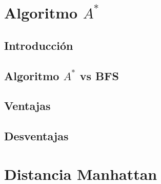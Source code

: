 \section{Algoritmo $A^{*}$}

\subsection*{Introducción}

\subsection*{Algoritmo $A^{*}$ vs BFS}


\subsection{Ventajas}

\subsection{Desventajas}



\section{Distancia Manhattan}

